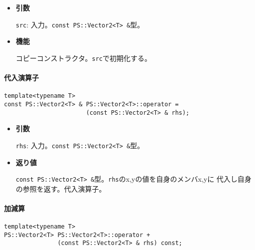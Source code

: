 \begin{itemize}

\item{{\bf 引数}}

{\tt src}: 入力。{\tt const PS::Vector2<T> \&}型。

\item{{\bf 機能}}

コピーコンストラクタ。{\tt src}で初期化する。

\end{itemize}

\paragraph{代入演算子}
\mbox{}

\begin{screen}
\begin{verbatim}
template<typename T>
const PS::Vector2<T> & PS::Vector2<T>::operator = 
                       (const PS::Vector2<T> & rhs);
\end{verbatim}
\end{screen}

\begin{itemize}

\item{{\bf 引数}}

{\tt rhs}: 入力。{\tt const PS::Vector2<T> \&}型。

\item{{\bf 返り値}}

{\tt const PS::Vector2<T> \&}型。{\tt rhs}のx,yの値を自身のメンバx,yに
代入し自身の参照を返す。代入演算子。

\end{itemize}


\paragraph{加減算}
\mbox{}

\begin{screen}
\begin{verbatim}
template<typename T>
PS::Vector2<T> PS::Vector2<T>::operator + 
               (const PS::Vector2<T> & rhs) const;
\end{verbatim}
\end{screen}


